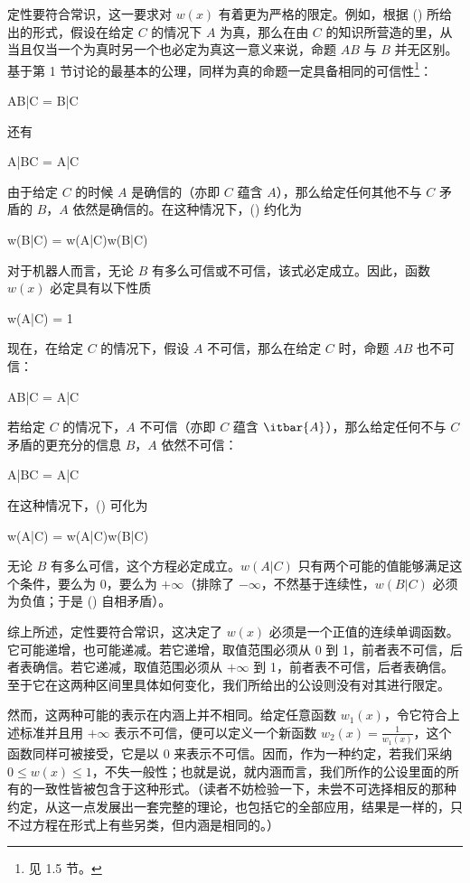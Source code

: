 定性要符合常识，这一要求对 $w(x)$ 有着更为严格的限定。例如，根据 () 所给出的形式，假设在给定 $C$ 的情况下 $A$ 为真，那么在由 $C$ 的知识所营造的里，从当且仅当一个为真时另一个也必定为真这一意义来说，命题 $AB$ 与 $B$ 并无区别。基于第 1 节讨论的最基本的公理，同样为真的命题一定具备相同的可信性\footnote{见 1.5 节。}：

\placeformula
\startformula
AB|C = B|C
\stopformula

还有

\placeformula
\startformula
A|BC = A|C
\stopformula

由于给定 $C$ 的时候 $A$ 是确信的（亦即 $C$ 蕴含 $A$），那么给定任何其他不与 $C$ 矛盾的 $B$，$A$ 依然是确信的。在这种情况下，() 约化为

\placeformula
\startformula
w(B|C) = w(A|C)w(B|C)
\stopformula

对于机器人而言，无论 $B$ 有多么可信或不可信，该式必定成立。因此，函数 $w(x)$ 必定具有以下性质

\placeformula
\startformula
w(A|C) = 1\;
\stopformula

现在，在给定 $C$ 的情况下，假设 $A$ 不可信，那么在给定 $C$ 时，命题 $AB$ 也不可信：

\placeformula
\startformula
AB|C = A|C
\stopformula

若给定 $C$ 的情况下，$A$ 不可信（亦即 $C$ 蕴含 $\itbar{A}$），那么给定任何不与 $C$ 矛盾的更充分的信息 $B$，$A$ 依然不可信：

\placeformula
\startformula
A|BC = A|C
\stopformula

在这种情况下，() 可化为

\placeformula[eq-zero]
\startformula
w(A|C) = w(A|C)w(B|C)
\stopformula

无论 $B$ 有多么可信，这个方程必定成立。$w(A|C)$ 只有两个可能的值能够满足这个条件，要么为 $0$，要么为 $+\infty$（排除了 $-\infty$，不然基于连续性，$w(B|C)$ 必须为负值；于是 (\in[eq-zero]) 自相矛盾）。

综上所述，定性要符合常识，这决定了 $w(x)$ 必须是一个正值的连续单调函数。它可能递增，也可能递减。若它递增，取值范围必须从 0 到 1，前者表不可信，后者表确信。若它递减，取值范围必须从 $+\infty$ 到 1，前者表不可信，后者表确信。至于它在这两种区间里具体如何变化，我们所给出的公设则没有对其进行限定。

然而，这两种可能的表示在内涵上并不相同。给定任意函数 $w_1(x)$，令它符合上述标准并且用 $+\infty$ 表示不可信，便可以定义一个新函数 $\displaystyle w_2(x) = \frac{1}{w_1(x)}$，这个函数同样可被接受，它是以 0 来表示不可信。因而，作为一种约定，若我们采纳 $0\le w(x)\le 1$，不失一般性；也就是说，就内涵而言，我们所作的公设里面的所有的一致性皆被包含于这种形式。（读者不妨检验一下，未尝不可选择相反的那种约定，从这一点发展出一套完整的理论，也包括它的全部应用，结果是一样的，只不过方程在形式上有些另类，但内涵是相同的。）
